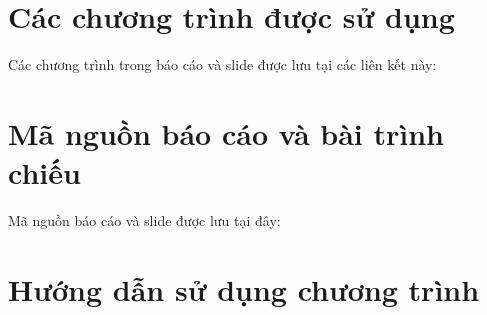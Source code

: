 \newpage
\appendix
\addappheadtotoc
\renewcommand{\thesection}{\Alph{section}}
\section{Các chương trình được sử dụng}
    \par Các chương trình trong báo cáo và slide được lưu tại các liên kết này: \url{} 

\section{Mã nguồn báo cáo và bài trình chiếu}
    \par Mã nguồn báo cáo và slide được lưu tại đây: \url{}

\section{Hướng dẫn sử dụng chương trình}

   